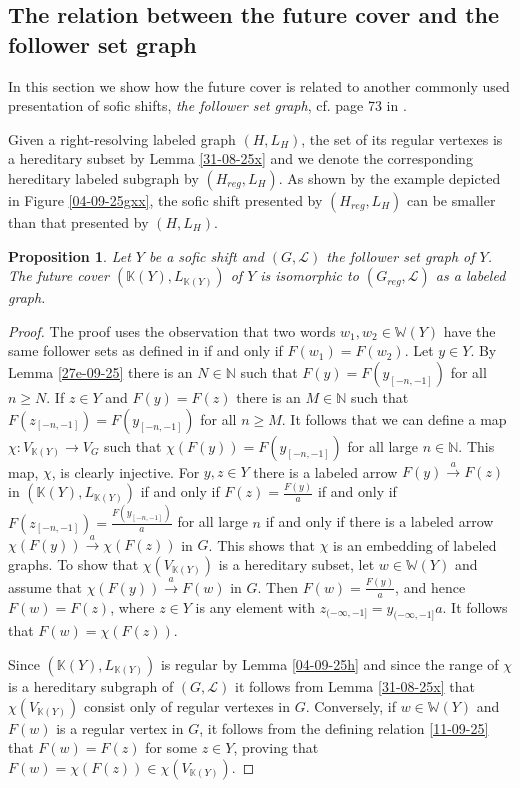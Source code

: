 \documentclass[12pt,oneside,english]{amsart}
\newtheorem{prop}[thm]{Proposition}
\begin{document}
\subsection{The relation between the future cover and the follower set graph}\label{REG}

In this section we show how the future cover is related to another commonly used presentation of sofic shifts, \emph{the follower set graph}, cf. page 73 in \cite{LM}. 


Given a right-resolving labeled graph $(H,L_H)$, the set of its regular vertexes is a hereditary subset by Lemma \ref{31-08-25x} and we denote the corresponding hereditary labeled subgraph by $(H_{reg},L_H)$. As shown by the example depicted in Figure \ref{04-09-25gxx}, the sofic shift presented by $(H_{reg},L_H)$ can be smaller than that presented by $(H,L_H)$.


\begin{prop}\label{16-10-25e}
Let $Y$ be a sofic shift and $(G,\mathcal L)$ the follower set graph of $Y$. The future cover $(\mathbb K(Y),L_{\mathbb K(Y)})$ of $Y$ is isomorphic to $(G_{reg},\mathcal L)$ as a labeled graph.
\end{prop}
\begin{proof} The proof uses the observation that two words $w_1,w_2 \in \mathbb W(Y)$ have the same follower sets as defined in \cite{LM} if and only if $F(w_1) = F(w_2)$. Let $y \in Y$. By Lemma \ref{27e-09-25} there is an $N \in \mathbb N$ such that  $F(y) = F(y_{[-n,-1]})$ for all $n \geq N$. If $z \in Y$ and $F(y) = F(z)$ there is an $M \in \mathbb N$ such that $F(z_{[-n,-1]}) = F(y_{[-n,-1]})$ for all $n \geq M$. It follows that we can define a map $\chi: V_{\mathbb K(Y)} \to V_G$ such that $\chi(F(y)) = F(y_{[-n,-1]})$ for all large $n \in \mathbb N$. This map, $\chi$, is clearly injective.  For $y,z \in Y$ there is a labeled arrow $F(y) \overset{a}{\to} F(z)$ in $(\mathbb K(Y),L_{\mathbb K(Y)})$ if and only if $F(z) = \frac{F(y)}{a}$ if and only if $F(z_{[-n,-1]}) = \frac{F(y_{[-n,-1]})}{a}$ for all large $n$ if and only if there is a labeled arrow $\chi(F(y)) \overset{a}{\to} \chi(F(z))$ in $G$. This shows that $\chi$ is an embedding of labeled graphs. To show that $\chi(V_{\mathbb K(Y)})$ is a hereditary subset, let $w \in \mathbb W(Y)$ and assume that $\chi(F(y)) \overset{a}{\to} F(w)$ in $G$. Then $F(w) = \frac{F(y)}{a}$, and hence $F(w) = F(z)$, where $z \in Y$ is any element with $z_{(-\infty,-1]} = y_{(-\infty,-1]}a$. It follows that $F(w) = \chi(F(z))$. 

Since $(\mathbb K(Y),L_{\mathbb K(Y)})$ is regular by Lemma \ref{04-09-25h} and since the range of $\chi$ is a hereditary subgraph of $(G,\mathcal L)$ it follows from Lemma \ref{31-08-25x} that $\chi(V_{\mathbb K(Y)})$ consist only of regular vertexes in $G$. Conversely, if $w \in \mathbb W(Y)$ and $F(w)$ is a regular vertex in $G$, it follows from the defining relation \eqref{11-09-25} that $F(w) = F(z)$ for some $z \in Y$, proving that $F(w) = \chi(F(z)) \in \chi(V_{\mathbb K(Y)})$.




\end{proof}
\end{document}
